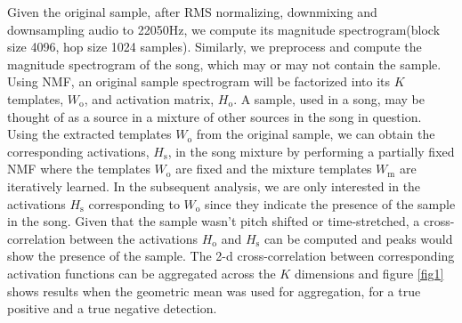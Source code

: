 \documentclass{article}
\begin{document}
Given the original sample, after RMS normalizing, downmixing and downsampling audio to 22050Hz, we compute its magnitude spectrogram(block size 4096, hop size 1024 samples). Similarly, we preprocess and compute the magnitude spectrogram of the song, which may or may not contain the sample.
Using NMF, an original sample spectrogram will be factorized into its $K$ templates, $W_\mathrm{o}$, and activation matrix, $H_\mathrm{o}$. A sample, used in a song, may be thought of as a source in a mixture of other sources in the song in question. Using the extracted templates $W_\mathrm{o}$ from the original sample, we can obtain the corresponding activations, $H_\mathrm{s}$, in the song mixture by performing a partially fixed NMF\cite{wu2015drum} where the templates $W_\mathrm{o}$ are fixed and the mixture templates $W_\mathrm{m}$ are iteratively learned. In the subsequent analysis, we are only interested in the activations $H_\mathrm{s}$ corresponding to $W_\mathrm{o}$ since they indicate the presence of the sample in the song. Given that the sample wasn't pitch shifted or time-stretched, a cross-correlation between the activations $H_\mathrm{o}$ and $H_\mathrm{s}$ can be computed and peaks would show the presence of the sample. The 2-d cross-correlation between corresponding activation functions can be aggregated across the $K$ dimensions and figure \ref{fig1} shows results when the geometric mean was used for aggregation, for a true positive and a true negative detection.
\end{document}
